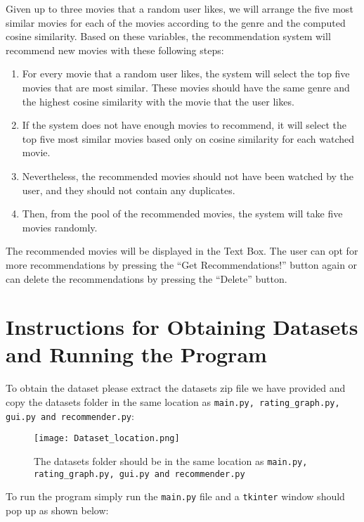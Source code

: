 \documentclass[fontsize=11pt]{article}
\begin{document}
\quad Given up to three movies that a random user likes, we will arrange the five most similar movies for each of the movies according to the genre and the computed cosine similarity. Based on these variables, the recommendation system will recommend new movies with these following steps:

\begin{enumerate}
    \item For every movie that a random user likes, the system will select the top five movies that are most similar. These movies should have the same genre and the highest cosine similarity with the movie that the user likes. 
    \item If the system does not have enough movies to recommend, it will select the top five most similar movies based only on cosine similarity for each watched movie. 
    \item Nevertheless, the recommended movies should not have been watched by the user, and they should not contain any duplicates.
    \item Then, from the pool of the recommended movies, the system will take five movies randomly.
    
\end{enumerate}


The recommended movies will be displayed in the Text Box. The user can opt for more recommendations by pressing the “Get Recommendations!” button again or can delete the recommendations by pressing the “Delete” button. 


\section*{Instructions for Obtaining Datasets and Running the Program}

\quad To obtain the dataset please extract the datasets zip file we have provided and copy the datasets folder in the same location as \texttt{main.py, rating\_graph.py, gui.py and recommender.py}:

\begin{figure}[h]
    \centering
    \texttt{[image: Dataset\_location.png]}
    \caption{The datasets folder should be in the same location as \texttt{main.py, rating\_graph.py, gui.py and recommender.py}}
\end{figure}

To run the program simply run the \texttt{main.py} file and a \texttt{tkinter} window should pop up as shown below:
\end{document}
